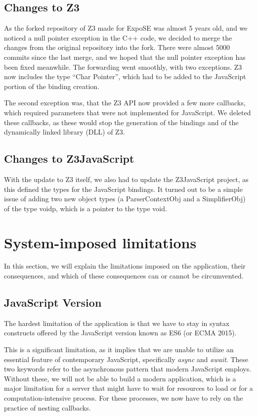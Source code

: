 \subsection{Changes to Z3}
\label{sec:changes-z3}
As the forked repository of Z3 made for ExpoSE was almost 5 years old, and we noticed a null pointer exception in the C++ code, we decided to merge the changes from the original repository into the fork. There were almost 5000 commits since the last merge, and we hoped that the null pointer exception has been fixed meanwhile. 
The forwarding went smoothly, with two exceptions. Z3 now includes the type “Char Pointer”, which had to be added to the JavaScript portion of the binding creation.

The second exception was, that the Z3 API now provided a few more callbacks, which required parameters that were not implemented for JavaScript. 
We deleted these callbacks, as these would stop the generation of the bindings and of the dynamically linked library (DLL) of Z3.

\subsection{Changes to Z3JavaScript}
\label{sec:changes-z3js}
With the update to Z3 itself, we also had to update the Z3JavaScript project, as this defined the types for the JavaScript bindings. It turned out to be a simple issue of adding two new object types (a ParserContextObj and a SimplifierObj) of the type voidp, which is a pointer to the type void.


\section{System-imposed limitations}
\label{sec:limits}
In this section, we will explain the limitations imposed on the application, their consequences, and which of these consequences can or cannot be circumvented.
\subsection{JavaScript Version}
\label{sec:jsversion}
The hardest limitation of the application is that we have to stay in syntax constructs offered by the JavaScript version known as ES6 (or ECMA 2015).

This is a significant limitation, as it implies that we are unable to utilize an essential feature of contemporary JavaScript, specifically \textit{async} and \textit{await}. These two keywords refer to the asynchronous pattern that modern JavaScript employs. Without these, we will not be able to build a modern application, which is a major limitation for a server that might have to wait for resources to load or for a computation-intensive process. For these processes, we now have to rely on the practice of nesting callbacks. 




